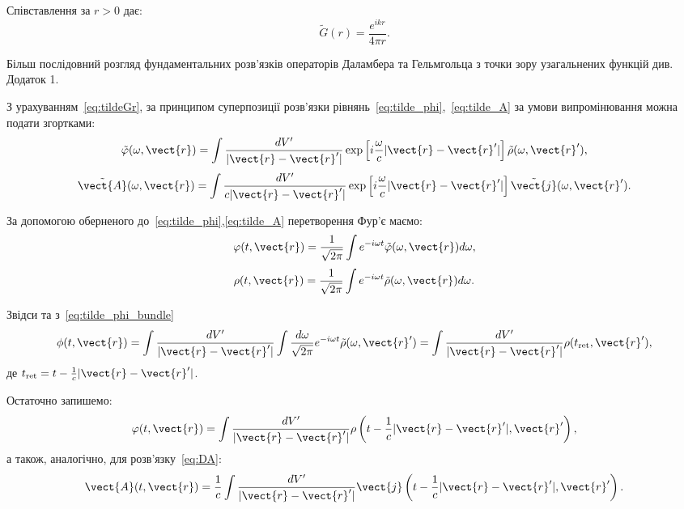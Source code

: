 Співставлення за $r > 0$ дає:
\begin{equation}\label{eq:tildeGr}
	\tilde{G}(r) = \frac{e^{ikr}}{4\pi r}.
\end{equation}

Більш послідовний розгляд фундаментальних розв’язків операторів Даламбера та Гельмгольца з точки зору узагальнених функцій див. Додаток 1.

З урахуванням~\eqref{eq:tildeGr}, за принципом суперпозиції розв’язки рівнянь~\eqref{eq:tilde_phi},~\eqref{eq:tilde_A} за умови випромінювання можна
подати згортками:
\begin{equation}\label{eq:tilde_phi_bundle}
	\tilde{\varphi} (\omega, \vect{r}) = \int \frac{dV'}{|\vect{r} - \vect{r}'|} \exp \left[ i \frac{\omega}{c} |\vect{r} - \vect{r}'| \right]
	\tilde{\rho} (\omega, \vect{r}'),
\end{equation}
\begin{equation}\label{eq:tilde_A_bundle}
	\tilde{\vect{A}}(\omega, \vect{r}) = \int \frac{dV'}{c|\vect{r} - \vect{r}'|} \exp \left[ i \frac{\omega}{c} |\vect{r} - \vect{r}'| \right]
	\tilde{\vect{j}} (\omega, \vect{r}').
\end{equation}

За допомогою оберненого до~\eqref{eq:tilde_phi},\eqref{eq:tilde_A} перетворення Фур'є маємо:
\begin{equation}
	\varphi (t, \vect{r}) = \frac{1}{\sqrt{2\pi}} \int e^{-i\omega t} \tilde{\varphi} (\omega, \vect{r}) d\omega,
\end{equation}
\begin{equation}
	\rho (t, \vect{r}) = \frac{1}{\sqrt{2\pi}} \int e^{-i\omega t} \tilde{\rho} (\omega, \vect{r}) d\omega.
\end{equation}

Звідси та з~\eqref{eq:tilde_phi_bundle}
\begin{equation}
	\phi (t, \vect{r}) = \int \frac{dV'}{|\vect{r} - \vect{r}'|} \int \frac{d\omega}{\sqrt{2\pi}} e^{-i\omega t} \tilde{\rho} (\omega, \vect{r}')
	= \int \frac{dV'}{|\vect{r} - \vect{r}'|} \rho (t_{\text{ret}}, \vect{r}'),
\end{equation}
де $t_{\text{ret}} = t - \frac{1}{c} |\vect{r} - \vect{r}'|$.

Остаточно запишемо:
\begin{equation}\label{eq:phi_ret}
	\varphi (t, \vect{r}) = \int \frac{dV'}{|\vect{r} - \vect{r}'|} \rho \left( t - \frac{1}{c} |\vect{r} - \vect{r}'|, \vect{r}' \right),
\end{equation}
а також, аналогічно, для розв’язку~\eqref{eq:DA}:
\begin{equation}\label{eq:A_ret}
	\vect{A} (t, \vect{r}) = \frac{1}{c} \int \frac{dV'}{|\vect{r} - \vect{r}'|} \vect{j} \left( t - \frac{1}{c} |\vect{r} - \vect{r}'|,
	\vect{r}' \right).
\end{equation}

